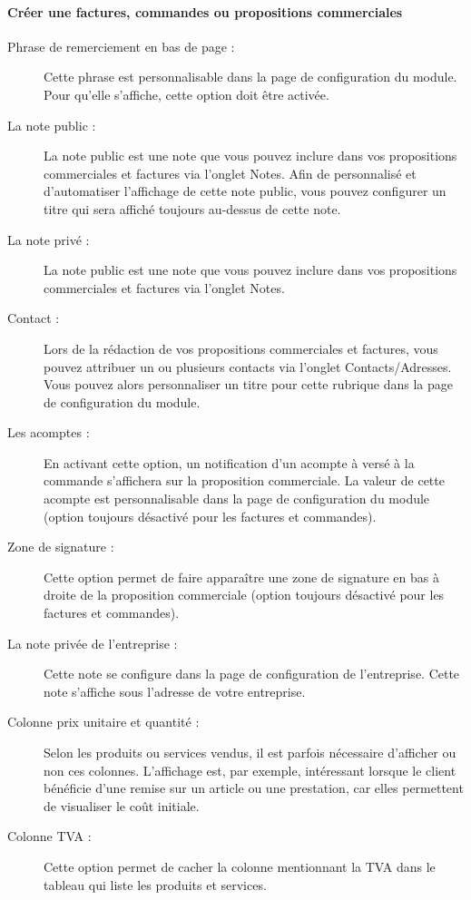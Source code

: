 \documentclass[a4paper,11pt]{article}
\begin{document}
\paragraph{Créer une factures, commandes ou propositions commerciales}
\begin{description}
  \item[Phrase de remerciement en bas de page :] Cette phrase est personnalisable dans la page de configuration du module. Pour qu'elle s'affiche, cette option doit être activée.
  \item[La note public :] La note public est une note que vous pouvez inclure dans vos propositions commerciales et factures via l'onglet Notes. Afin de personnalisé et d'automatiser l'affichage de cette note public, vous pouvez configurer un titre qui sera affiché toujours au-dessus de cette note.
  \item[La note privé :] La note public est une note que vous pouvez inclure dans vos propositions commerciales et factures via l'onglet Notes.
  \item[Contact :] Lors de la rédaction de vos propositions commerciales et factures, vous pouvez attribuer un ou plusieurs contacts via l'onglet Contacts/Adresses. Vous pouvez alors personnaliser un titre pour cette rubrique dans la page de configuration du module.
  \item[Les acomptes :]En activant cette option, un notification d'un acompte à versé à la commande s'affichera sur la proposition commerciale. La valeur de cette acompte est personnalisable dans la page de configuration du module (option toujours désactivé pour les factures et commandes).
  \item[Zone de signature :] Cette option permet de faire apparaître une zone de signature en bas à droite de la proposition commerciale (option toujours désactivé pour les factures et commandes).
  \item[La note privée de l'entreprise :] Cette note se configure dans la page de configuration de l'entreprise. Cette note s'affiche sous l'adresse de votre entreprise.
  \item[Colonne prix unitaire et quantité :] Selon les produits ou services vendus, il est parfois nécessaire d'afficher ou non ces colonnes. L'affichage est, par exemple, intéressant lorsque le client bénéficie d'une remise sur un article ou une prestation, car elles permettent de visualiser le coût initiale.
  \item[Colonne TVA :] Cette option permet de cacher la colonne mentionnant la TVA dans le tableau qui liste les produits et services. 

\end{description}
\end{document}
